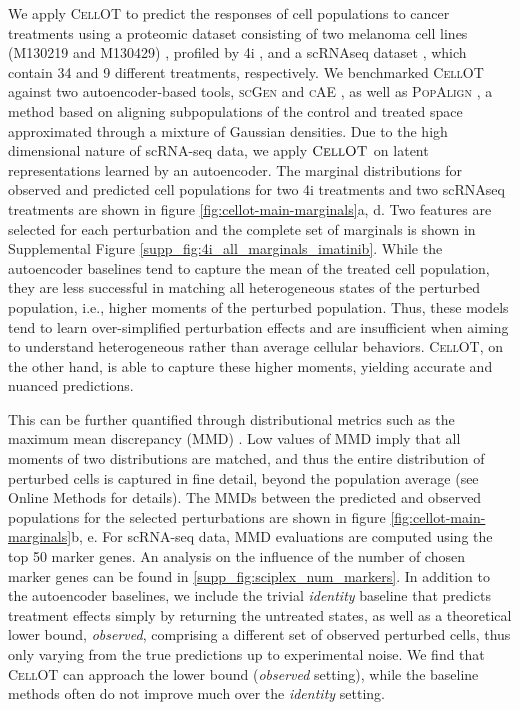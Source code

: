 We apply \textsc{CellOT} to predict the responses of cell populations to cancer treatments using a proteomic dataset consisting of two melanoma cell lines (M130219 and M130429) \cite{raaijmakers2015}, profiled by 4i \cite{gut2018}, and a scRNAseq dataset \cite{srivatsan2020}, which contain 34 and 9 different treatments, respectively.
We benchmarked \textsc{CellOT} against two autoencoder-based tools, \textsc{scGen} \cite{lotfollahi2019} and \textsc{cAE} \cite{lopez2018}, as well as \textsc{PopAlign} \cite{chen2020}, a method based on aligning subpopulations of the control and treated space approximated through a mixture of Gaussian densities.
Due to the high dimensional nature of scRNA-seq data, we apply $\textsc{CellOT}$ on latent representations learned by an autoencoder.
The marginal distributions for observed and predicted cell populations for two 4i treatments and two scRNAseq treatments are shown in figure \ref{fig:cellot-main-marginals}a, d.
Two features are selected for each perturbation and the complete set of marginals is shown in Supplemental Figure \ref{supp_fig:4i_all_marginals_imatinib}. %
While the autoencoder baselines tend to capture the mean of the treated cell population, they are less successful in matching all heterogeneous states of the perturbed population, i.e., higher moments of the perturbed population.
Thus, these models tend to learn over-simplified perturbation effects and are insufficient when aiming to understand heterogeneous rather than average cellular behaviors.
\textsc{CellOT}, on the other hand, is able to capture these higher moments, yielding accurate and nuanced predictions.

This can be further quantified %
through distributional metrics such as the maximum mean discrepancy (MMD) \cite{gretton2012}.
Low values of MMD imply that all moments of two distributions are matched, and thus the entire distribution of perturbed cells is captured in fine detail, beyond the population average (see Online Methods for details).
The MMDs between the predicted and observed populations for the selected perturbations are shown in figure \ref{fig:cellot-main-marginals}b, e.
For scRNA-seq data, MMD evaluations are computed using the top 50 marker genes. An analysis on the influence of the number of chosen marker genes can be found in \ref{supp_fig:sciplex_num_markers}.
In addition to the autoencoder baselines, we include the trivial \emph{identity} baseline that predicts treatment effects simply by returning the untreated states,
as well as a theoretical lower bound, \emph{observed}, comprising a different set of observed perturbed cells, thus only varying from the true predictions up to experimental noise.
We find that \textsc{CellOT} can approach the lower bound (\emph{observed} setting), while the baseline methods often do not improve much over the \emph{identity} setting.

